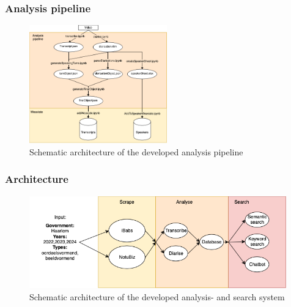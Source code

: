 \documentclass[aspectratio=169,sidebar]{uva-inf-presentation}
\begin{document}
\begin{frame}\frametitle{Analysis pipeline}
\begin{figure}
    \centering
    \includegraphics[width=0.53\textwidth]{images/pipeline.png}
    \caption{Schematic architecture of the developed analysis pipeline}
    \label{fig:pipeline}
\end{figure}
\end{frame}

\begin{frame}\frametitle{Architecture}
\begin{figure}
    \centering
    \includegraphics[width=0.99\textwidth]{images/arch.png}
    \caption{Schematic architecture of the developed analysis- and search system}
    \label{fig:pipeline}
\end{figure}
\end{frame}


\end{document}
